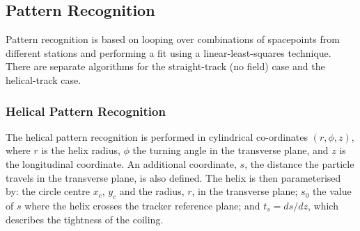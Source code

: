 
  \subsection{Pattern Recognition}
  \label{subsec:PatternRecognition}

  Pattern recognition is based on looping over combinations of spacepoints from different stations and performing a fit using a linear-least-squares technique. There are separate algorithms for the straight-track (no field) case and the helical-track case.

   \subsubsection{Helical Pattern Recognition}
   \label{subsubsec:HelicalPatternRecognition}

   
   The helical pattern recognition is performed in cylindrical co-ordinates $(r, \phi, z)$, where $r$ is the helix radius, $\phi$ the turning angle in the transverse plane, and $z$ is the longitudinal coordinate. An additional coordinate, $s$, the distance the particle travels in the transverse plane, is also defined. The helix is then parameterised by: the circle centre $x_c$, $y_c$ and the radius, $r$, in the transverse plane; $s_0$ the value of $s$ where the helix crosses the tracker reference plane; and $t_s = ds/dz$, which describes the tightness of the coiling. %


